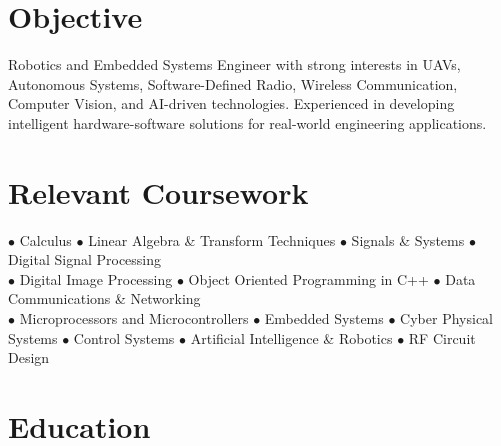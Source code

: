 \documentclass{my_cv}
\begin{document}

\section{Objective}
\hspace{1pt}\parbox{0.99\textwidth}{
Robotics and Embedded Systems Engineer with strong interests in UAVs, Autonomous Systems, Software-Defined Radio, Wireless Communication, Computer Vision, and AI-driven technologies. Experienced in developing intelligent hardware-software solutions for real-world engineering applications.
}

\vspace{-7pt}

\section{Relevant Coursework}

\noindent
$\bullet$ Calculus \quad
$\bullet$ Linear Algebra \& Transform Techniques \quad
$\bullet$ Signals \& Systems \quad
$\bullet$ Digital Signal Processing \\
$\bullet$ Digital Image Processing \quad
$\bullet$ Object Oriented Programming in C++ \quad
$\bullet$ Data Communications \& Networking \\
$\bullet$ Microprocessors and Microcontrollers \quad
$\bullet$ Embedded Systems \quad
$\bullet$ Cyber Physical Systems \quad
$\bullet$ Control Systems \quad
$\bullet$ Artificial Intelligence \& Robotics \quad
$\bullet$ RF Circuit Design

\vspace{-7pt}

\section{Education}

\vspace{0.1cm}
\\
\vspace{0.1cm}
\end{document}
